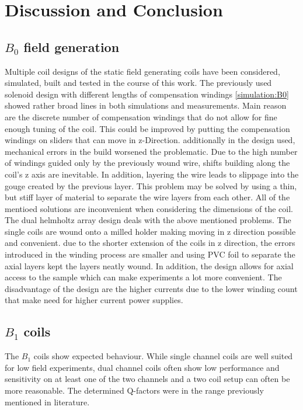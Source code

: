 \chapter{Discussion and Conclusion}\label{chap:conclusion}
    \section{$B_0$ field generation}
        Multiple coil designs of the static field generating coils have been considered, simulated, built and tested in the course of this work. The previously used solenoid design with different lengths of compensation windings \ref{simulation:B0} showed rather broad lines in both simulations and measurements. Main reason are the discrete number of compensation windings that do not allow for fine enough tuning of the coil. This could be improved by putting the compensation windings on sliders that can move in z-Direction. additionally in the design used, mechanical errors in the build worsened the problematic. Due to the high number of windings guided only by the previously wound wire, shifts building along the coil's z axis are inevitable. In addition, layering the wire leads to slippage into the gouge created by the previous layer. This problem may be solved by using a thin, but stiff layer of material to separate the wire layers from each other. All of the mentioed solutions are inconvenient when considering the dimensions of the coil.
        The dual helmholtz array design deals with the above mentioned problems. The single coils are wound onto a milled holder making moving in z direction possible and convenient. due to the shorter extension of the coils in z direction, the errors introduced in the winding process are smaller and using PVC foil to separate the axial layers kept the layers neatly wound.
        In addition, the design allows for axial access to the sample which can make experiments a lot more convenient. The disadvantage of the design are the higher currents due to the lower winding count that make need for higher current power supplies.
    \section{$B_1$ coils}
        The $B_1$ coils show expected behaviour. While single channel coils are well suited for low field experiments, dual channel coils often show low performance and sensitivity on at least one of the two channels and a two coil setup can often be more reasonable. The determined Q-factors were in the range previously mentioned in literature. 
